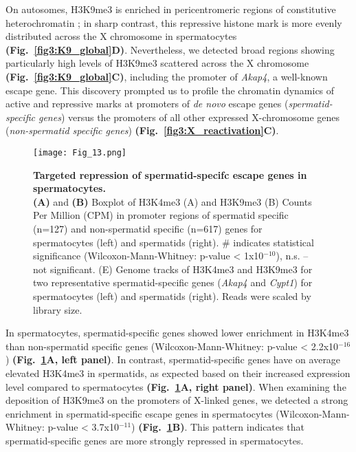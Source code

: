 On autosomes, H3K9me3 is enriched in pericentromeric regions of constitutive heterochromatin \citep{Peters2001}; in sharp contrast, this repressive histone mark is more evenly distributed across the X chromosome in spermatocytes  \textbf{(Fig.~\ref{fig3:K9_global}D)}. Nevertheless, we detected broad regions showing particularly high levels of H3K9me3 scattered across the X chromosome  \textbf{(Fig.~\ref{fig3:K9_global}C)}, including the promoter of \textit{Akap4}, a well-known escape gene. This discovery prompted us to profile the chromatin dynamics of active and repressive marks at promoters of \emph{de novo} escape genes (\emph{spermatid-specific genes}) versus the promoters of all other expressed X-chromosome genes (\emph{non-spermatid specific genes}) \textbf{(Fig.~\ref{fig3:X_reactivation}C)}.

\begin{figure}[!h]
\centering
\texttt{[image: Fig\_13.png]}
\caption[Targeted repression of spermatid-specifc escape genes in spermatocytes]{\textbf{Targeted repression of spermatid-specifc escape genes in spermatocytes.} \\
\textbf{(A)} and \textbf{(B)} Boxplot of H3K4me3 (A) and H3K9me3 (B) Counts Per Million (CPM) in promoter regions of spermatid specific (n=127) and non-spermatid specific (n=617) genes for spermatocytes (left) and spermatids (right).  \# indicates statistical significance (Wilcoxon-Mann-Whitney: p-value < 1x10$^{-10}$), n.s. – not significant. 
(E) Genome tracks of H3K4me3 and H3K9me3 for two representative spermatid-specific genes (\textit{Akap4} and \textit{Cypt1}) for spermatocytes (left) and spermatids (right). Reads were scaled by library size.}
\label{fig3:K9_K4_targeted}
\end{figure}

In spermatocytes, spermatid-specific genes showed lower enrichment in H3K4me3 than non-spermatid specific genes (Wilcoxon-Mann-Whitney: p-value < 2.2x10$^{-16}$) \textbf{(Fig.~\ref{fig3:K9_K4_targeted}A, left panel)}. In contrast, spermatid-specific genes have on average elevated H3K4me3 in spermatids, as expected based on their increased expression level compared to spermatocytes \textbf{(Fig.~\ref{fig3:K9_K4_targeted}A, right panel)}. When examining the deposition of H3K9me3 on the promoters of X-linked genes, we detected a strong enrichment in spermatid-specific escape genes in spermatocytes (Wilcoxon-Mann-Whitney: p-value < 3.7x10$^{-11}$) \textbf{(Fig.~\ref{fig3:K9_K4_targeted}B)}. This pattern indicates that spermatid-specific genes are more strongly repressed in spermatocytes. \\

